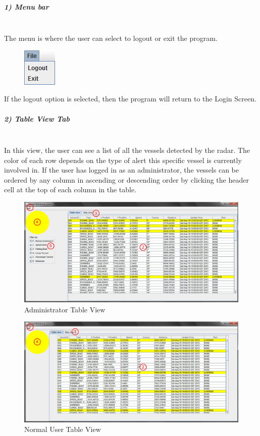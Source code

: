 \documentclass{article}
\begin{document}
\subparagraph{1) Menu bar \\ \\}

The menu is where the user can select to logout or exit the program.
	\begin{figure}[!htb]
	\centering
	\includegraphics[scale=1]{images/userManual4.jpg}
	\end{figure}

If the logout option is selected, then the program will return to the Login Screen.\\

\pagebreak

\subparagraph{2) Table View Tab \\ \\}
In this view, the user can see a list of all the vessels detected by the radar. The color of each row depends on the type of alert this specific vessel is currently involved in. If the user has logged in as an administrator, the vessels can be ordered by any column in ascending or descending order by clicking the header cell at the top of each column in the table.

	\begin{figure}[!htb]
	\caption{Administrator Table View}
	\centering
	\includegraphics[scale=0.4]{images/userManual2_admin.jpg}
	\end{figure}

	\begin{figure}[!htb]
	\caption{Normal User Table View}
	\centering
	\includegraphics[scale=0.4]{images/userManual2_user.jpg}
	\end{figure}
\end{document}

